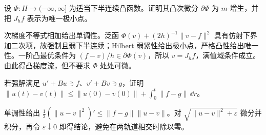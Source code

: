 \begin{exercise}[凸函数的近端预解式]\label{ex:y14-proximal}
设 $\Phi:H\to(-\infty,\infty]$ 为适当下半连续凸函数。证明其凸次微分 $\partial\Phi$ 为 $m$-增生，并把 $J_hf$ 表示为唯一极小点。
\end{exercise}
\begin{solution}
次梯度不等式相加给出单调性。泛函 $\Phi(v)+(2h)^{-1}\|v-f\|^2$ 具有仿射下界加二次项，故强制且弱下半连续；Hilbert 弱紧性给出极小点，严格凸性给出唯一性。一阶凸最优条件为 $(f-v)/h\in\partial\Phi(v)$，所以 $v=J_hf$，满值域条件成立。由此得凸梯度流，但不要求 $\Phi$ 处处可微。
\end{solution}

\begin{exercise}[外力的稳定性]\label{ex:y14-forced-monotone}
若强解满足 $u'+Bu\ni f$、$v'+Bv\ni g$，证明 $\|u(t)-v(t)\|\le\|u(0)-v(0)\|+\int_0^t\|f-g\|\,\dd r$。
\end{exercise}
\begin{solution}
单调性给出 $\tfrac12(\|u-v\|^2)'\le\|f-g\|\|u-v\|$。对 $\sqrt{\|u-v\|^2+\varepsilon}$ 微分并积分，再令 $\varepsilon\downarrow0$ 即得结论，避免在两轨道相交时除以零。
\end{solution}
